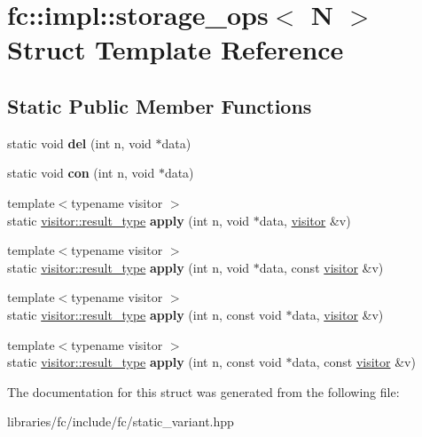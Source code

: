 \hypertarget{structfc_1_1impl_1_1storage__ops_3_01_n_01_4}{}\section{fc\+:\+:impl\+:\+:storage\+\_\+ops$<$ N $>$ Struct Template Reference}
\label{structfc_1_1impl_1_1storage__ops_3_01_n_01_4}
\subsection*{Static Public Member Functions}
\begin{DoxyCompactItemize}
\item 
\mbox{\label{structfc_1_1impl_1_1storage__ops_3_01_n_01_4_afafba38d67880753a757c4a70aa1d547}} 
static void {\bfseries del} (int n, void $\ast$data)
\item 
\mbox{\label{structfc_1_1impl_1_1storage__ops_3_01_n_01_4_a98b9658a1fb4e8b6be01e042e9b241cb}} 
static void {\bfseries con} (int n, void $\ast$data)
\item 
\mbox{\label{structfc_1_1impl_1_1storage__ops_3_01_n_01_4_ac56121148fe973a3ffb1694a6666619d}} 
{\footnotesize template$<$typename visitor $>$ }\\static \mbox{\hyperlink{struct_result}{visitor\+::result\+\_\+type}} {\bfseries apply} (int n, void $\ast$data, \mbox{\hyperlink{structfc_1_1visitor}{visitor}} \&v)
\item 
\mbox{\label{structfc_1_1impl_1_1storage__ops_3_01_n_01_4_a82e09ef444e9f1274cf51207e2aca123}} 
{\footnotesize template$<$typename visitor $>$ }\\static \mbox{\hyperlink{struct_result}{visitor\+::result\+\_\+type}} {\bfseries apply} (int n, void $\ast$data, const \mbox{\hyperlink{structfc_1_1visitor}{visitor}} \&v)
\item 
\mbox{\label{structfc_1_1impl_1_1storage__ops_3_01_n_01_4_ac6f4faaa6dcd96124015e30448a38094}} 
{\footnotesize template$<$typename visitor $>$ }\\static \mbox{\hyperlink{struct_result}{visitor\+::result\+\_\+type}} {\bfseries apply} (int n, const void $\ast$data, \mbox{\hyperlink{structfc_1_1visitor}{visitor}} \&v)
\item 
\mbox{\label{structfc_1_1impl_1_1storage__ops_3_01_n_01_4_a9ed0f50081d9db0544daadd3f862be4b}} 
{\footnotesize template$<$typename visitor $>$ }\\static \mbox{\hyperlink{struct_result}{visitor\+::result\+\_\+type}} {\bfseries apply} (int n, const void $\ast$data, const \mbox{\hyperlink{structfc_1_1visitor}{visitor}} \&v)
\end{DoxyCompactItemize}


The documentation for this struct was generated from the following file\+:\begin{DoxyCompactItemize}
\item 
libraries/fc/include/fc/static\+\_\+variant.\+hpp\end{DoxyCompactItemize}
